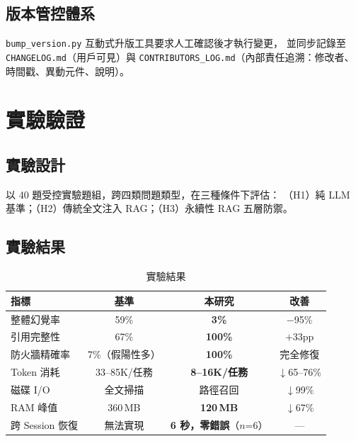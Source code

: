 \documentclass[conference]{IEEEtran}
\begin{document}
\subsection{版本管控體系}

\texttt{bump\_version.py} 互動式升版工具要求人工確認後才執行變更，
並同步記錄至 \texttt{CHANGELOG.md}（用戶可見）與
\texttt{CONTRIBUTORS\_LOG.md}（內部責任追溯：修改者、時間戳、異動元件、說明）。

\section{實驗驗證}

\subsection{實驗設計}

以 40 題受控實驗題組，跨四類問題類型，在三種條件下評估：
（H1）純 LLM 基準；（H2）傳統全文注入 RAG；（H3）永續性 RAG 五層防禦。

\subsection{實驗結果}

\begin{table}[ht]
\caption{實驗結果}
\label{tab:results}
\centering
\begin{tabular}{lccc}
\toprule
\textbf{指標} & \textbf{基準} & \textbf{本研究} & \textbf{改善} \\
\midrule
整體幻覺率     & 59\%          & \textbf{3\%}           & $-$95\% \\
引用完整性     & 67\%          & \textbf{100\%}         & $+$33pp \\
防火牆精確率   & 7\%（假陽性多）& \textbf{100\%}         & 完全修復 \\
Token 消耗    & 33--85K/任務  & \textbf{8--16K/任務}   & $\downarrow$65--76\% \\
磁碟 I/O      & 全文掃描       & 路徑召回               & $\downarrow$99\% \\
RAM 峰值      & 360\,MB       & \textbf{120\,MB}       & $\downarrow$67\% \\
跨 Session 恢復 & 無法實現     & \textbf{6 秒，零錯誤}（$n$=6）& --- \\
\bottomrule
\end{tabular}
\end{table}
\end{document}

